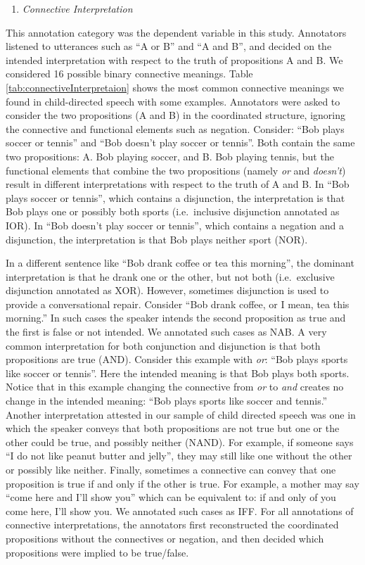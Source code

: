 \documentclass[
  ,man,floatsintext]{apa6}
\providecommand{\tightlist}{%
  \setlength{\itemsep}{0pt}\setlength{\parskip}{0pt}}
\begin{document}
\begin{enumerate}
\def\labelenumi{\arabic{enumi}.}
\tightlist
\item
  \emph{Connective Interpretation}
\end{enumerate}

This annotation category was the dependent variable in this study. Annotators listened to utterances such as ``A or B'' and ``A and B'', and decided on the intended interpretation with respect to the truth of propositions A and B. We considered 16 possible binary connective meanings. Table \ref{tab:connectiveInterpretaion} shows the most common connective meanings we found in child-directed speech with some examples. Annotators were asked to consider the two propositions (A and B) in the coordinated structure, ignoring the connective and functional elements such as negation. Consider: ``Bob plays soccer or tennis'' and ``Bob doesn't play soccer or tennis''. Both contain the same two propositions: A. Bob playing soccer, and B. Bob playing tennis, but the functional elements that combine the two propositions (namely \emph{or} and \emph{doesn't}) result in different interpretations with respect to the truth of A and B. In ``Bob plays soccer or tennis'', which contains a disjunction, the interpretation is that Bob plays one or possibly both sports (i.e.~inclusive disjunction annotated as IOR). In ``Bob doesn't play soccer or tennis'', which contains a negation and a disjunction, the interpretation is that Bob plays neither sport (NOR).

In a different sentence like ``Bob drank coffee or tea this morning'', the dominant interpretation is that he drank one or the other, but not both (i.e.~exclusive disjunction annotated as XOR). However, sometimes disjunction is used to provide a conversational repair. Consider ``Bob drank coffee, or I mean, tea this morning.'' In such cases the speaker intends the second proposition as true and the first is false or not intended. We annotated such cases as NAB. A very common interpretation for both conjunction and disjunction is that both propositions are true (AND). Consider this example with \emph{or}: ``Bob plays sports like soccer or tennis''. Here the intended meaning is that Bob plays both sports. Notice that in this example changing the connective from \emph{or} to \emph{and} creates no change in the intended meaning: ``Bob plays sports like soccer and tennis.'' Another interpretation attested in our sample of child directed speech was one in which the speaker conveys that both propositions are not true but one or the other could be true, and possibly neither (NAND). For example, if someone says ``I do not like peanut butter and jelly'', they may still like one without the other or possibly like neither. Finally, sometimes a connective can convey that one proposition is true if and only if the other is true. For example, a mother may say ``come here and I'll show you'' which can be equivalent to: if and only of you come here, I'll show you. We annotated such cases as IFF. For all annotations of connective interpretations, the annotators first reconstructed the coordinated propositions without the connectives or negation, and then decided which propositions were implied to be true/false.
\end{document}
